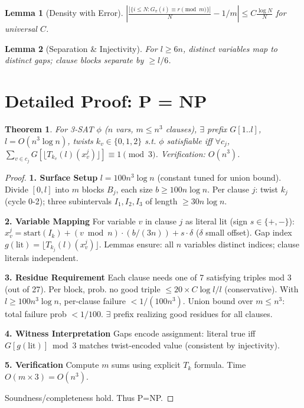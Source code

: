 \documentclass[11pt]{article}
\newtheorem{theorem}{Theorem}[section]
\newtheorem{lemma}{Lemma}[section]
\begin{document}
\begin{lemma}[Density with Error]
$\left| \frac{|\{i\leq N: G_\pi(i)\equiv r \pmod{m}\}|}{N} - 1/m \right| \leq C \frac{\log N}{N}$ for universal $C$.
\end{lemma}

\begin{lemma}[Separation \& Injectivity]
For $l \geq 6n$, distinct variables map to distinct gaps; clause blocks separate by $\geq l/6$.
\end{lemma}

\section{Detailed Proof: P = NP}

\begin{theorem}
For 3-SAT $\phi$ ($n$ vars, $m\leq n^3$ clauses), $\exists$ prefix $G[1..l]$, $l=O(n^3\log n)$, twists $k_v\in\{0,1,2\}$ s.t. $\phi$ satisfiable iff $\forall c_j$, $\sum_{v\in c_j} G[\lfloor T_{k_v}(l)(x_v^j)\rfloor] \equiv 1 \pmod{3}$.
Verification: $O(n^3)$.
\end{theorem}

\begin{proof}

\textbf{1. Surface Setup}  
$l = 100 n^3 \log n$ (constant tuned for union bound).  
Divide $[0,l]$ into $m$ blocks $B_j$, each size $b \geq 100 n \log n$.  
Per clause $j$: twist $k_j$ (cycle 0-2); three subintervals $I_1,I_2,I_3$ of length $\geq 30 n \log n$.

\textbf{2. Variable Mapping}  
For variable $v$ in clause $j$ as literal lit (sign $s\in\{+,-\}$):  
$x_v^j = \mathrm{start}(I_k) + (v \bmod n) \cdot (b/(3n)) + s \cdot \delta$ ($\delta$ small offset).  
Gap index $g(\mathrm{lit}) = \lfloor T_{k_j}(l)(x_v^j) \rfloor$.  
Lemmas ensure: all $n$ variables distinct indices; clause literals independent.

\textbf{3. Residue Requirement}  
Each clause needs one of 7 satisfying triples mod 3 (out of 27).  
Per block, prob. no good triple $\leq 20 \times C \log l / l$ (conservative).  
With $l \geq 100 n^3 \log n$, per-clause failure $< 1/(100 n^3)$.  
Union bound over $m\leq n^3$: total failure prob $< 1/100$.  
$\exists$ prefix realizing good residues for all clauses.

\textbf{4. Witness Interpretation}  
Gaps encode assignment: literal true iff $G[g(\mathrm{lit})] \bmod 3$ matches twist-encoded value (consistent by injectivity).

\textbf{5. Verification}  
Compute $m$ sums using explicit $T_k$ formula. Time $O(m \times 3) = O(n^3)$.

Soundness/completeness hold. Thus P=NP.
\end{proof}
\end{document}

